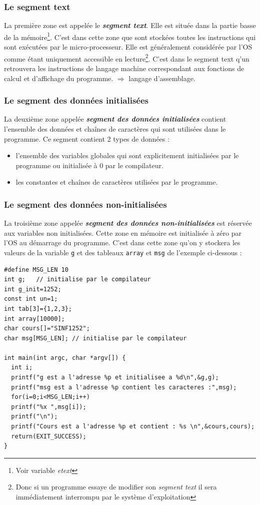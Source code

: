 \subsubsection{Le segment text}
La première zone est appelée le \textbf{\textit{segment text}}.
Elle est située dans la partie basse de la mémoire\footnote{Voir variable \textit{etext}}.
C'est dans cette zone que sont stockées toutes les instructions qui sont exécutées par le micro-processeur.
Elle est généralement considérée par l'OS comme étant uniquement accessible en lecture\footnote{Donc si un programme essaye de modifier son \textit{segment text} il sera immédiatement interrompu par le système d'exploitation}.
C'est dans le segment text q'un retrouvera les instructions de langage machine correspondant aux fonctions de calcul et d'affichage du programme.
$\Rightarrow$ langage d'assemblage.

\subsubsection{Le segment des données initialisées}
La deuxième zone appelée \textbf{\textit{segment des données initialisées}} contient l'ensemble des données et chaînes de caractères qui sont utilisées dans le programme.
Ce segment contient 2 types de données :
\begin{itemize}
  \item l'ensemble des variables globales qui sont explicitement initialisées par le programme ou initialisée à 0 par le compilateur.
  \item les constantes et chaînes de caractères utilisées par le programme.
\end{itemize}

\subsubsection{Le segment des données non-initialisées}
La troisième zone appelée \textbf{\textit{segment des données non-initialisées}} est réservée aux variables non initialisées.
Cette zone en mémoire est initialisée à zéro par l'OS au démarrage du programme.
C'est dans cette zone qu'on y stockera les valeurs de la variable \texttt{g} et des tableaux \texttt{array} et \texttt{msg} de l'exemple ci-dessous :

\begin{lstlisting}
#define MSG_LEN 10
int g;   // initialise par le compilateur
int g_init=1252;
const int un=1;
int tab[3]={1,2,3};
int array[10000];
char cours[]="SINF1252";
char msg[MSG_LEN]; // initialise par le compilateur

int main(int argc, char *argv[]) {
  int i;
  printf("g est a l'adresse %p et initialisee a %d\n",&g,g);
  printf("msg est a l'adresse %p contient les caracteres :",msg);
  for(i=0;i<MSG_LEN;i++)
  printf("%x ",msg[i]);
  printf("\n");
  printf("Cours est a l'adresse %p et contient : %s \n",&cours,cours);
  return(EXIT_SUCCESS);
}
\end{lstlisting}



